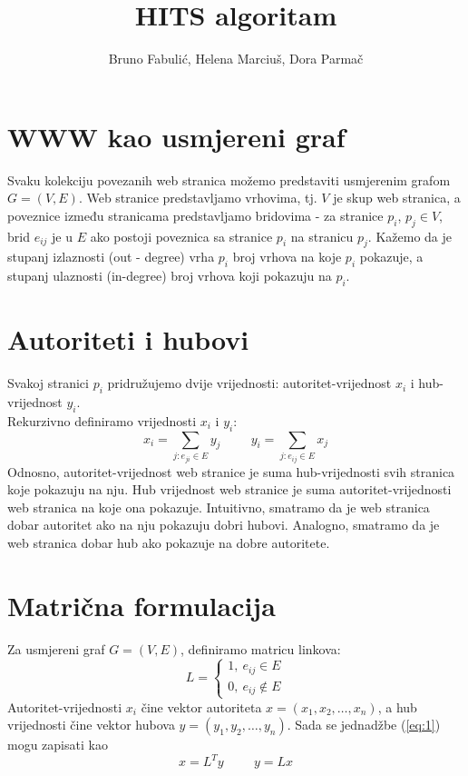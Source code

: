 \documentclass[11pt]{article}
\title{HITS algoritam}
\author{Bruno Fabuli\'{c}, Helena Marciu\v{s}, Dora Parma\v{c}}
\begin{document}
	\maketitle
	\newpage
	\hypersetup{linkcolor=black}
	\tableofcontents
\newpage
\hypersetup{linkcolor=red}

\section{WWW kao usmjereni graf}
Svaku kolekciju povezanih web stranica možemo predstaviti usmjerenim grafom $G=(V,E)$. Web stranice predstavljamo vrhovima, tj. $V$ je skup web stranica, a poveznice između stranicama predstavljamo bridovima - za stranice $p_{i}$, $p_{j} \in V$, brid $e_{ij}$ je u $E$ ako postoji poveznica sa stranice $p_{i}$ na stranicu $p_{j}$. Kažemo da je stupanj izlaznosti (out - degree) vrha $p_{i}$ broj vrhova na koje $p_{i}$ pokazuje, a stupanj ulaznosti (in-degree) broj vrhova koji pokazuju na $p_{i}$.

\section{Autoriteti i hubovi}
Svakoj stranici $p_{i}$ pridružujemo dvije vrijednosti: autoritet-vrijednost $x_{i}$ i hub-vrijednost $y_{i}$. \\
Rekurzivno definiramo vrijednosti $x_{i}$ i $y_{i}$:
\begin{equation} \label{eq:1}
x_{i} = \sum_{j: e_{ji}\in E} y_{j} \hspace{1cm}  y_{i} = \sum_{j: e_{ij}\in E} x_{j}
\end{equation}
Odnosno, autoritet-vrijednost web stranice je suma hub-vrijednosti svih stranica koje pokazuju na nju. Hub vrijednost web stranice je suma autoritet-vrijednosti web stranica na koje ona pokazuje.
Intuitivno, smatramo da je web stranica dobar autoritet ako na nju pokazuju dobri hubovi. Analogno, smatramo da je web stranica dobar hub ako pokazuje na dobre autoritete.
\section{Matrična formulacija}
Za usmjereni graf $G=(V,E)$, definiramo matricu linkova:
$$L = \begin{cases}
1,~e_{ij}\in E\\
0,~e_{ij}\not\in E
\end{cases}$$
Autoritet-vrijednosti $x_{i}$ čine vektor autoriteta $x = (x_{1}, x_{2}, \dots, x_{n})$, a hub vrijednosti čine vektor hubova $y = (y_{1}, y_{2}, \dots, y_{n})$.
Sada se jednadžbe (\ref{eq:1}) mogu zapisati kao
\begin{equation}\label{eq:2}
x = L^{T}y\hspace{1cm}y = Lx
\end{equation}
\end{document}
